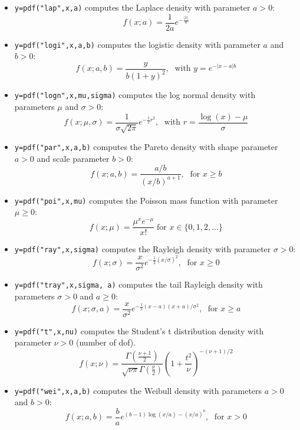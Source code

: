 \begin{mandescription}
\begin{itemize}
\item {} \verb!y=pdf("lap",x,a)! computes the Laplace
  density with parameter $a > 0$:
$$
     f(x; a) = \frac{1}{2a} e^{-\frac{|x|}{a}}
$$

\item {} \verb!y=pdf("logi",x,a,b)! computes the logistic
  density with parameter $a$ and $b > 0$:
$$
     f(x; a,b) = \frac{y}{b (1+y)^2}, \; \mbox{ with } y = e^{-{|x-a|}{b}}
$$


\item {} \verb!y=pdf("logn",x,mu,sigma)! computes
  the log normal density with parameters $\mu$ and $\sigma > 0$:
$$
     f(x; \mu, \sigma) = \frac{ 1 }{ \sigma \sqrt{2\pi}}
     e^{-\frac{1}{2} r^2 }, \; \mbox{ with } r = \frac{\log(x)-\mu}{\sigma}
$$


\item {} \verb!y=pdf("par",x,a,b)! computes the Pareto
  density with shape parameter $a > 0$ and scale parameter $b > 0$:
$$
     f(x; a, b) = \frac{ a/b }{ (x/b)^{a+1} }, \; \mbox{ for } x \ge b
$$


\item {} \verb!y=pdf("poi",x,mu)! computes
  the Poisson mass function with parameter $\mu \ge 0$:
$$
     f(x; \mu) = \frac{\mu^x e^{-\mu}}{x!} \;\mbox{for } x \in \{0, 1, 2, \dots\}
$$

\item {} \verb!y=pdf("ray",x,sigma)! computes the Rayleigh
  density with parameter $\sigma > 0$:
$$
     f(x; \sigma) = \frac{x}{\sigma^2} e^{-\frac{1}{2} (x/\sigma)^2 }, \; \mbox{ for } x \ge 0
$$

\item {} \verb!y=pdf("tray",x,sigma, a)! computes
  the tail Rayleigh density with parameters $\sigma > 0$ and $a \ge 0$:
$$
     f(x; \sigma, a) = \frac{x}{\sigma^2} e^{-\frac{1}{2} (x-a)(x+a)/\sigma^2 }, \; \mbox{ for } x \ge a
$$


\item {} \verb!y=pdf("t",x,nu)! computes
  the Student's t distribution density with parameter $\nu > 0$
  (number of dof).
$$
    f(x; \nu) = \frac{\Gamma(\frac{\nu+1}{2})}{\sqrt{\nu \pi}\Gamma(\frac{\nu}{2})} \left( 1 + \frac{t^2}{\nu} \right)^{-(\nu+1)/2} 
$$


\item {} \verb!y=pdf("wei",x,a,b)! computes the Weibull
  density with parameters $a > 0$ and $b > 0$:
$$
     f(x; a, b) = \frac{b}{a} e^{ (b-1)\log(x/a) - (x/a)^b }, \; \mbox{ for } x > 0
$$

\end{itemize}

\end{mandescription}


